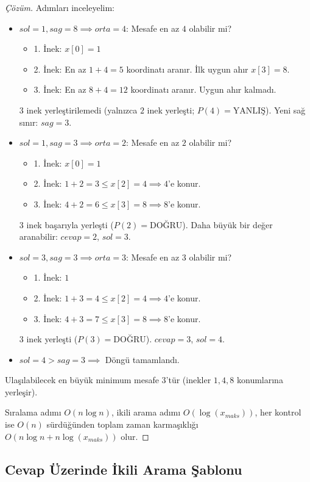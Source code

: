 \begin{proof}[Çözüm]
Adımları inceleyelim:
\begin{itemize}
    \item $sol = 1, sag = 8 \implies orta = 4$:
    Mesafe en az $4$ olabilir mi?
    \begin{itemize}
        \item 1. İnek: $x[0] = 1$
        \item 2. İnek: En az $1 + 4 = 5$ koordinatı aranır. İlk uygun ahır $x[3] = 8$.
        \item 3. İnek: En az $8 + 4 = 12$ koordinatı aranır. Uygun ahır kalmadı.
    \end{itemize}
    $3$ inek yerleştirilemedi (yalnızca $2$ inek yerleşti; $P(4) = \text{YANLIŞ}$).
    Yeni sağ sınır: $sag = 3$.
    \item $sol = 1, sag = 3 \implies orta = 2$:
    Mesafe en az $2$ olabilir mi?
    \begin{itemize}
        \item 1. İnek: $x[0] = 1$
        \item 2. İnek: $1 + 2 = 3 \le x[2] = 4 \implies 4$'e konur.
        \item 3. İnek: $4 + 2 = 6 \le x[3] = 8 \implies 8$'e konur.
    \end{itemize}
    $3$ inek başarıyla yerleşti ($P(2) = \text{DOĞRU}$).
    Daha büyük bir değer aranabilir: $cevap = 2$, $sol = 3$.
    \item $sol = 3, sag = 3 \implies orta = 3$:
    Mesafe en az $3$ olabilir mi?
    \begin{itemize}
        \item 1. İnek: $1$
        \item 2. İnek: $1 + 3 = 4 \le x[2] = 4 \implies 4$'e konur.
        \item 3. İnek: $4 + 3 = 7 \le x[3] = 8 \implies 8$'e konur.
    \end{itemize}
    $3$ inek yerleşti ($P(3) = \text{DOĞRU}$).
    $cevap = 3$, $sol = 4$.
    \item $sol = 4 > sag = 3 \implies$ Döngü tamamlandı.
\end{itemize}
Ulaşılabilecek en büyük minimum mesafe $3$'tür (inekler $1, 4, 8$ konumlarına yerleşir).

Sıralama adımı $O(n \log n)$, ikili arama adımı $O(\log(x_{maks}))$, her kontrol ise $O(n)$ sürdüğünden toplam zaman karmaşıklığı $O(n \log n + n \log(x_{maks}))$ olur.
\end{proof}

\subsection{Cevap Üzerinde İkili Arama Şablonu}


